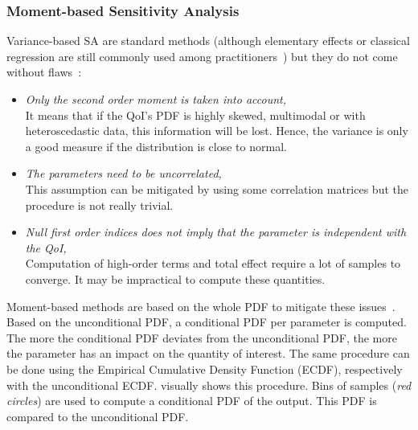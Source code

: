 \subsubsection{Moment-based Sensitivity Analysis}
Variance-based SA are standard methods (although elementary effects or classical regression are still commonly used among practitioners~\cite{ferretti2016}) but they do not come without flaws~\cite{borgonovo2016}:

\begin{itemize}
\item \emph{Only the second order moment is taken into account,}\\
It means that if the QoI's PDF is highly skewed, multimodal or with heteroscedastic data, this information will be lost. Hence, the variance is only a good measure if the distribution is close to normal.
\item \emph{The parameters need to be uncorrelated,}\\
This assumption can be mitigated by using some correlation matrices but the procedure is not really trivial.
\item \emph{Null first order indices does not imply that the parameter is independent with the QoI,}\\
Computation of high-order terms and total effect require a lot of samples to converge. It may be impractical to compute these quantities.
\end{itemize}

Moment-based methods are based on the whole PDF to mitigate these issues~\cite{borgonovo2007}. Based on the unconditional PDF, a conditional PDF per parameter is computed. The more the conditional PDF deviates from the unconditional PDF, the more the parameter has an impact on the quantity of interest. The same procedure can be done using the Empirical Cumulative Density Function (ECDF), respectively with the unconditional ECDF.  visually shows this procedure. Bins of samples (\emph{red circles}) are used to compute a conditional PDF of the output. This PDF is compared to the unconditional PDF.

